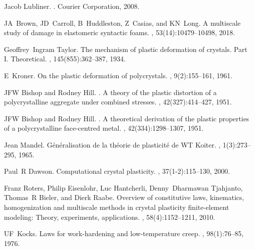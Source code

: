 \documentclass[12pt,reqno]{article}
\begin{document}
\begin{thebibliography}{10}
Jacob Lubliner.
.
\newblock Courier Corporation, 2008.

JA~Brown, JD~Carroll, B~Huddleston, Z~Casias, and KN~Long.
\newblock A multiscale study of damage in elastomeric syntactic foams.
, 53(14):10479--10498, 2018.

Geoffrey~Ingram Taylor.
\newblock The mechanism of plastic deformation of crystals. {P}art {I}.
{T}heoretical.
,
145(855):362--387, 1934.

E~Kroner.
\newblock On the plastic deformation of polycrystals.
, 9(2):155--161, 1961.

JFW Bishop and Rodney Hill.
. {A} theory of the plastic distortion of a polycrystalline
aggregate under combined stresses.
, 42(327):414--427, 1951.

JFW Bishop and Rodney Hill.
. {A} theoretical derivation of the plastic properties of a
polycrystalline face-centred metal.
, 42(334):1298--1307, 1951.

Jean Mandel.
\newblock G{\'e}n{\'e}ralisation de la th{\'e}orie de plasticit{\'e} de {WT}
{K}oiter.
, 1(3):273--295,
1965.

Paul~R Dawson.
\newblock Computational crystal plasticity.
,
37(1-2):115--130, 2000.

Franz Roters, Philip Eisenlohr, Luc Hantcherli, Denny~Dharmawan Tjahjanto,
Thomas~R Bieler, and Dierk Raabe.
\newblock Overview of constitutive laws, kinematics, homogenization and
multiscale methods in crystal plasticity finite-element modeling: Theory,
experiments, applications.
, 58(4):1152--1211, 2010.

UF~Kocks.
\newblock Laws for work-hardening and low-temperature creep.
, 98(1):76--85,
1976.


\end{thebibliography}
\end{document}
